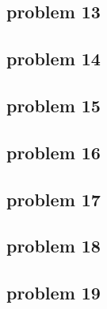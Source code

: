 \subsection{problem 13}


\subsection{problem 14}


\subsection{problem 15}


\subsection{problem 16}


\subsection{problem 17}


\subsection{problem 18}


\subsection{problem 19}
